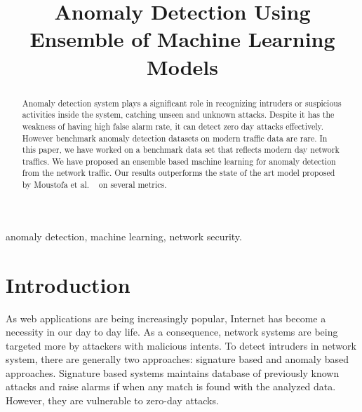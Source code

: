 \documentclass[14pt, conference]{IEEEtran}
\begin{document}
\title{Anomaly Detection Using Ensemble of Machine Learning Models}

\author{

}

\maketitle

\begin{abstract}
Anomaly detection system plays a significant role in recognizing intruders or suspicious activities inside the system, catching unseen and unknown attacks. Despite it has the weakness of having high false alarm rate, it can detect zero day attacks effectively. However benchmark anomaly detection datasets on modern traffic data are rare. In this paper, we have  worked on a benchmark data set that reflects modern day network traffics. We have proposed  an ensemble based machine learning for anomaly detection from the network traffic. Our results outperforms the state of the art model proposed by Moustofa et al. ~\cite{moustafa2018anomaly} on several metrics.
\end{abstract}

\begin{IEEEkeywords}
anomaly detection, machine learning,  network security.
\end{IEEEkeywords}

\section{Introduction}

As web applications are being increasingly popular,  Internet has become a necessity in our day to day life. As a consequence, network systems are being targeted more by attackers with malicious intents. To detect intruders in network system, there are generally two approaches: signature based and anomaly based approaches. Signature based systems maintains database of previously known attacks and raise alarms  if when any match is found with the analyzed data. However, they are vulnerable  to zero-day attacks.
\end{document}
